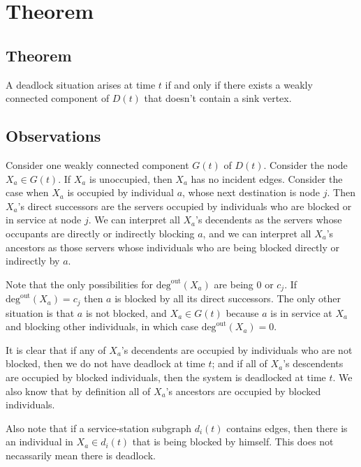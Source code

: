 \documentclass{article}
\begin{document}
\section{Theorem}

\subsection*{Theorem}

A deadlock situation arises at time $t$ if and only if there exists a weakly connected component of $D(t)$ that doesn't contain a sink vertex.\newline

\subsection*{Observations}

Consider one weakly connected component $G(t)$ of $D(t)$.
Consider the node $X_a \in G(t)$. If $X_a$ is unoccupied, then $X_a$ has no incident edges.
Consider the case when $X_a$ is occupied by individual $a$, whose next destination is node $j$.
Then $X_a$'s direct successors are the servers occupied by individuals who are blocked or in service at node $j$.
We can interpret all $X_a$'s decendents as the servers whose occupants are directly or indirectly blocking $a$, and we can interpret all $X_a$'s ancestors as those servers whose individuals who are being blocked directly or indirectly by $a$.\newline

Note that the only possibilities for $\text{deg}^{\text{out}}(X_a)$ are being 0 or $c_j$.
If $\text{deg}^{\text{out}}(X_a) = c_j$ then $a$ is blocked by all its direct successors.
The only other situation is that $a$ is not blocked, and $X_a \in G(t)$ because $a$ is in service at $X_a$ and blocking other individuals, in which case $\text{deg}^{\text{out}}(X_a) = 0$.\newline

It is clear that if any of $X_a$'s decendents are occupied by individuals who are not blocked, then we do not have deadlock at time $t$; and if all of $X_a$'s descendents are occupied by blocked individuals, then the system is deadlocked at time $t$.
We also know that by definition all of $X_a$'s ancestors are occupied by blocked individuals.\newline

Also note that if a service-station subgraph $d_i(t)$ contains edges, then there is an individual in $X_a \in d_i(t)$ that is being blocked by himself.
This does not necassarily mean there is deadlock.\newline
\end{document}
